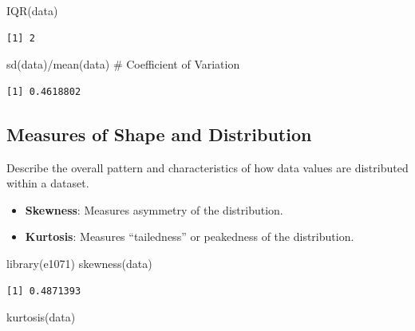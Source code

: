 \documentclass[
  man,
  floatsintext,
  longtable,
  nolmodern,
  notxfonts,
  notimes,
  colorlinks=true,linkcolor=blue,citecolor=blue,urlcolor=blue]{apa7}
\newenvironment{Shaded}{\begin{snugshade}}{\end{snugshade}}
\newcommand{\CommentTok}[1]{\textcolor[rgb]{0.37,0.37,0.37}{#1}}
\newcommand{\FunctionTok}[1]{\textcolor[rgb]{0.28,0.35,0.67}{#1}}
\newcommand{\NormalTok}[1]{\textcolor[rgb]{0.00,0.23,0.31}{#1}}
\newcommand{\SpecialCharTok}[1]{\textcolor[rgb]{0.37,0.37,0.37}{#1}}
\providecommand{\tightlist}{%
  \setlength{\itemsep}{0pt}\setlength{\parskip}{0pt}}
\begin{document}
\begin{Shaded}
\begin{Highlighting}[]
\FunctionTok{IQR}\NormalTok{(data)}
\end{Highlighting}
\end{Shaded}

\begin{verbatim}
[1] 2
\end{verbatim}

\begin{Shaded}
\begin{Highlighting}[]
\FunctionTok{sd}\NormalTok{(data)}\SpecialCharTok{/}\FunctionTok{mean}\NormalTok{(data) }\CommentTok{\# Coefficient of Variation}
\end{Highlighting}
\end{Shaded}

\begin{verbatim}
[1] 0.4618802
\end{verbatim}

\subsection{Measures of Shape and
Distribution}\label{measures-of-shape-and-distribution}

Describe the overall pattern and characteristics of how data values are
distributed within a dataset.

\begin{itemize}
\tightlist
\item
  \textbf{Skewness}: Measures asymmetry of the distribution.
\item
  \textbf{Kurtosis}: Measures ``tailedness'' or peakedness of the
  distribution.
\end{itemize}

\begin{Shaded}
\begin{Highlighting}[]
\FunctionTok{library}\NormalTok{(e1071)}
\FunctionTok{skewness}\NormalTok{(data)}
\end{Highlighting}
\end{Shaded}

\begin{verbatim}
[1] 0.4871393
\end{verbatim}

\begin{Shaded}
\begin{Highlighting}[]
\FunctionTok{kurtosis}\NormalTok{(data) }
\end{Highlighting}
\end{Shaded}
\end{document}
